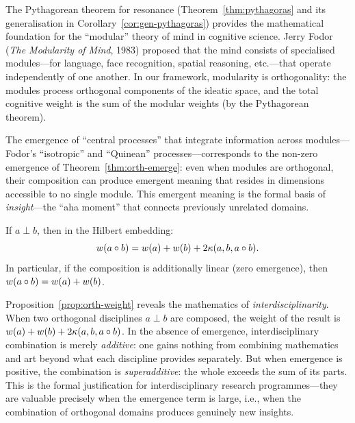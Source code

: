 \begin{remark}
\label{rem:ch12:pythagoras_cognitive_science}
The Pythagorean theorem for resonance
(Theorem~\ref{thm:pythagoras} and its generalisation in
Corollary~\ref{cor:gen-pythagoras}) provides the mathematical foundation
for the ``modular'' theory of mind in cognitive science.  Jerry Fodor
(\emph{The Modularity of Mind}, 1983) proposed that the mind consists of
specialised modules---for language, face recognition, spatial reasoning,
etc.---that operate independently of one another.  In our framework,
modularity is orthogonality: the modules process orthogonal components of
the ideatic space, and the total cognitive weight is the sum of the modular
weights (by the Pythagorean theorem).

The emergence of ``central processes'' that integrate information across
modules---Fodor's ``isotropic'' and ``Quinean'' processes---corresponds
to the non-zero emergence of Theorem~\ref{thm:orth-emerge}: even when
modules are orthogonal, their composition can produce emergent meaning
that resides in dimensions accessible to no single module.  This emergent
meaning is the formal basis of \emph{insight}---the ``aha moment'' that
connects previously unrelated domains.
\end{remark}


\begin{proposition}
\label{prop:orth-weight}
If $a \perp b$, then in the Hilbert embedding:
\[
  w(a \circ b) = w(a) + w(b) + 2\kappa(a, b, a \circ b).
\]
In particular, if the composition is additionally linear (zero emergence),
then $w(a \circ b) = w(a) + w(b)$.
\end{proposition}

\begin{remark}
\label{rem:ch12:orth_weight_interdisciplinarity}
Proposition~\ref{prop:orth-weight} reveals the mathematics of
\emph{interdisciplinarity}.  When two orthogonal disciplines $a \perp b$
are composed, the weight of the result is $w(a) + w(b) +
2\kappa(a, b, a \circ b)$.  In the absence of emergence, interdisciplinary
combination is merely \emph{additive}: one gains nothing from combining
mathematics and art beyond what each discipline provides separately.  But
when emergence is positive, the combination is \emph{superadditive}: the
whole exceeds the sum of its parts.  This is the formal justification for
interdisciplinary research programmes---they are valuable precisely when the
emergence term is large, i.e., when the combination of orthogonal domains
produces genuinely new insights.
\end{remark}



